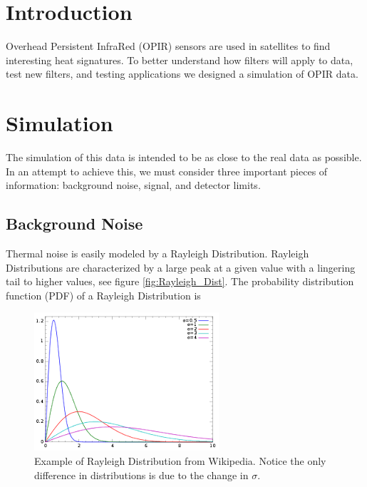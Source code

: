 \documentclass[12pt]{article} %
\begin{document}
\section{Introduction}

Overhead Persistent InfraRed (OPIR) sensors are used in satellites to find interesting heat signatures. To better understand how filters will apply to data, test new filters, and testing applications we designed a simulation of OPIR data.

\section{Simulation}

The simulation of this data is intended to be as close to the real data as possible. In an attempt to achieve this, we must consider three important pieces of information: background noise, signal, and detector limits.

\subsection{Background Noise}\label{sec:Background}

Thermal noise is easily modeled by a Rayleigh Distribution. Rayleigh Distributions are characterized by a large peak at a given value with a lingering tail to higher values, see figure \ref{fig:Rayleigh_Dist}. The probability distribution function (PDF) of a Rayleigh Distribution  is 

\begin{figure}[h]
\centering
\includegraphics[width=\textwidth]{Rayleigh.png} 
\caption{Example of Rayleigh Distribution from Wikipedia. Notice the only difference in distributions is due to the change in $\sigma$.}
\end{figure}
\end{document}
